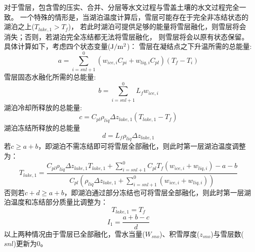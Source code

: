 对于雪层，包含雪的压实、合并、分层等水文过程与雪盖土壤的水文过程完全一致。
一个特殊的情形是，当湖泊温度计算后，雪层可能存在于完全非冻结状态的湖泊之上($T_{lake,1}>T_f$)，
若此时湖泊可提供足够的能量将雪层融化，则雪层将会消失；否则，若湖泊完全冻结都无法将雪层融化，
则雪层将会以原有状态保留。具体计算如下，考虑四个状态变量($\rm J/m^2$)：
雪层在凝结点之下升温所需的总能量:
\begin{equation}
a=\sum_{i=s n l+1}^{0}\left(w_{ice, i} C_{p i}+w_{liq, i} C_{p l}\right)\left(T_{f}-T_{i}\right)
\end{equation}
雪层固态水融化所需的总能量:
\begin{equation}
b=\sum_{i=s n l+1}^{0} L_{f} w_{ice, i}
\end{equation}
湖泊冷却所释放的总能量:
\begin{equation}
c=C_{p l} \rho_{liq} \Delta z_{lake, 1}\left(T_{lake, 1}-T_{f}\right)
\end{equation}
湖泊冻结所释放的总能量
\begin{equation}
    d=L_{f} \rho_{liq} \Delta z_{lake, 1}
\end{equation}
若$c\geq a+b$，即湖泊不需冻结即可将雪层全部融化，则此时第一层湖泊温度调整为：
\begin{equation}
T_{lake, 1}=\frac{C_{p l} \rho_{liq} \Delta z_{lake, 1} T_{lake, 1}+\sum_{i=s n l+1}^{0} C_{p l}
 T_{f}\left(w_{ice, i}+w_{liq, i}\right)-a-b}{C_{p l}\left(\rho_{liq} \Delta z_{lake, 1}+\sum_{i=s n l+1}^{0}
 \left(w_{ice, i}+w_{liq, i}\right)\right)}
\end{equation}
否则若$c+d\geq a+b$，即湖泊通过部分冻结也可将雪层全部融化，则此时第一层湖泊温度和冻结部分质量比调整为：
\begin{equation}
T_{lake, 1}=T_{f}
\end{equation}
\begin{equation}
I_{1}=\frac{a+b-c}{d}
\end{equation}
以上两种情况由于雪层已全部融化，雪水当量($W_{sno}$)、积雪厚度($z_{sno}$)与雪层数($snl$)更新为0。